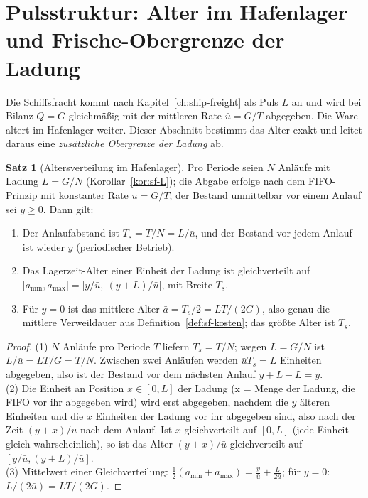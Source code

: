 \documentclass[a4paper, 12pt, twoside, openright]{report}
\theoremstyle{definition}
\theoremstyle{definition}
\newtheorem{satz}{Satz}[chapter]
\begin{document}
\section{Pulsstruktur: Alter im Hafenlager und Frische-Obergrenze der Ladung}
\label{sec:sb-puls}

Die Schiffsfracht kommt nach Kapitel~\ref{ch:ship-freight} als Puls $L$ an und wird bei
Bilanz $Q=G$ gleichmäßig mit der mittleren Rate $\bar u=G/T$ abgegeben. Die Ware altert im
Hafenlager weiter. Dieser Abschnitt bestimmt das Alter exakt und leitet daraus eine
\emph{zusätzliche Obergrenze der Ladung} ab.

\begin{satz}[Altersverteilung im Hafenlager]\label{satz:sb-alter}
Pro Periode seien $N$ Anläufe mit Ladung $L=G/N$ (Korollar~\ref{kor:sf-L}); die Abgabe
erfolge nach dem FIFO-Prinzip mit konstanter Rate $\bar u=G/T$; der Bestand unmittelbar vor
einem Anlauf sei $y\ge0$. Dann gilt:
\begin{enumerate}
  \item Der Anlaufabstand ist $T_s=T/N=L/\bar u$, und der Bestand vor jedem Anlauf ist wieder
    $y$ (periodischer Betrieb).
  \item Das Lagerzeit-Alter einer Einheit der Ladung ist gleichverteilt auf
    $\bigl[a_{\min},a_{\max}\bigr]=\bigl[y/\bar u,\ (y+L)/\bar u\bigr]$, mit Breite $T_s$.
  \item Für $y=0$ ist das mittlere Alter $\bar a=T_s/2=LT/(2G)$, also genau die mittlere
    Verweildauer aus Definition~\ref{def:sf-kosten}; das größte Alter ist $T_s$.
\end{enumerate}
\end{satz}

\begin{proof}
(1) $N$ Anläufe pro Periode $T$ liefern $T_s=T/N$; wegen $L=G/N$ ist $L/\bar u=LT/G=T/N$.
Zwischen zwei Anläufen werden $\bar uT_s=L$ Einheiten abgegeben, also ist der Bestand
vor dem nächsten Anlauf $y+L-L=y$.\\
(2) Die Einheit an Position $x\in[0,L]$ der Ladung (x = Menge der Ladung, die FIFO vor ihr
abgegeben wird) wird erst abgegeben, nachdem die $y$ älteren Einheiten und die $x$
Einheiten der Ladung vor ihr abgegeben sind, also nach der Zeit $(y+x)/\bar u$ nach dem
Anlauf. Ist $x$ gleichverteilt auf $[0,L]$ (jede Einheit gleich wahrscheinlich), so ist
das Alter $(y+x)/\bar u$ gleichverteilt auf $[y/\bar u,(y+L)/\bar u]$.\\
(3) Mittelwert einer Gleichverteilung: $\frac12(a_{\min}+a_{\max})=\frac{y}{\bar u}+\frac{L}{2\bar u}$; für $y=0$:
$L/(2\bar u)=LT/(2G)$.
\end{proof}
\end{document}
